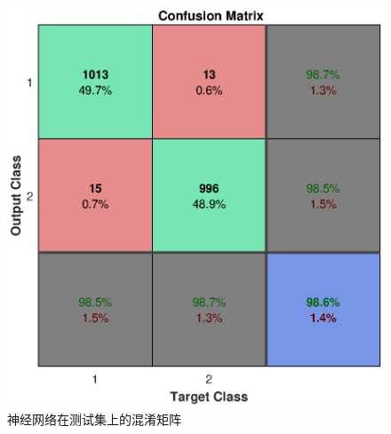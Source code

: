 \documentclass[UTF8,a4paper]{ctexart}
\begin{document}
\begin{figure}
\includegraphics[width=\textwidth]{NNTconfu.eps}
\caption{神经网络在测试集上的混淆矩阵}
\label{TNN}
\end{figure}
\end{document}
